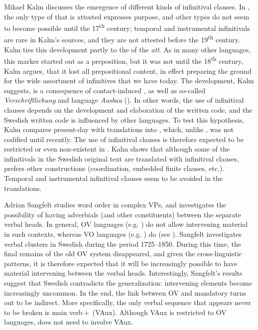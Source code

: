 \documentclass[output=paper]{langscibook}
\begin{document}
Mikael Kalm discusses the emergence of different kinds of  infinitival clauses. In , the only type of   that is attested expresses purpose, and other types do not seem to become possible until the 17\textsuperscript{th} century; temporal and instrumental  infinitivals are rare in Kalm’s sources, and they are not attested before the 19\textsuperscript{th} century. Kalm ties this development partly to the  of the  \textit{att}. As in many other  languages, this marker started out as a preposition, but it was not until the 18\textsuperscript{th} century, Kalm argues, that it lost all prepositional content, in effect preparing the ground for the wide assortment of  infinitives that we have today. The development, Kalm suggests, is a consequence of contact-induced , as well as so-called \textit{Verschriftlichung} and language \textit{Ausbau} (\citealt{Hoder2009, Hoder2010}). In other words, the use of  infinitival clauses depends on the development and elaboration of the written code, and the Swedish written code is influenced by other languages. To test this hypothesis, Kalm compares present-day  with translations into , which, unlike , was not codified until recently. The use of  infinitival clauses is therefore expected to be restricted or even non-existent in . Kalm shows that although some of the  infinitivals in the Swedish original text are translated with infinitival clauses,  prefers other constructions (coordination, embedded finite clauses, etc.). Temporal and instrumental infinitival clauses seem to be avoided in the  translations.



Adrian Sangfelt studies word order in complex VPs, and investigates the possibility of having adverbials (and other constituents) between the separate verbal heads. In general, OV languages (e.g. ) do not allow intervening material in such contexts, whereas VO languages (e.g. ) do (see \citealt{Haider2010,Haider2013}). Sangfelt investigates verbal clusters in Swedish during the period 1725–1850. During this time, the final remains of the old OV system disappeared, and given the cross-linguistic patterns, it is therefore expected that it will be increasingly possible to have material intervening between the verbal heads. Interestingly, Sangfelt’s results suggest that Swedish contradicts the generalization: intervening elements become increasingly uncommon. In the end, the link between OV and mandatory  turns out to be indirect. More specifically, the only verbal sequence that appears never to be broken is main verb\,+\, (VAux). Although VAux is restricted to OV languages,  does not need to involve VAux.
\end{document}
